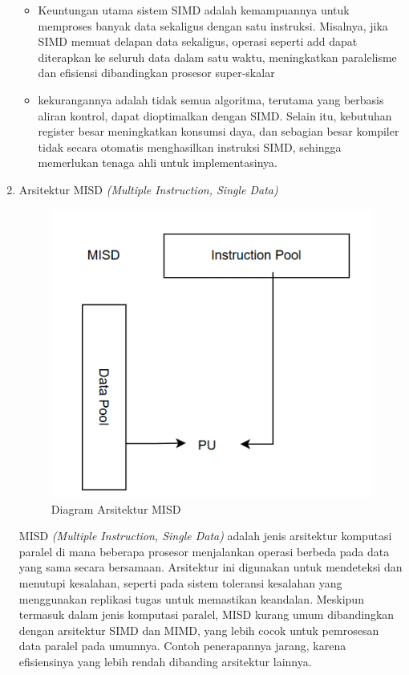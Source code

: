 \documentclass[12pt]{article}
\begin{document}
\begin{enumerate}
    \begin{itemize}
        \item Keuntungan utama sistem SIMD adalah kemampuannya untuk memproses banyak data sekaligus dengan satu instruksi. Misalnya, jika SIMD memuat delapan data sekaligus, operasi seperti add dapat diterapkan ke seluruh data dalam satu waktu, meningkatkan paralelisme dan efisiensi dibandingkan prosesor super-skalar
        \item kekurangannya adalah tidak semua algoritma, terutama yang berbasis aliran kontrol, dapat dioptimalkan dengan SIMD. Selain itu, kebutuhan register besar meningkatkan konsumsi daya, dan sebagian besar kompiler tidak secara otomatis menghasilkan instruksi SIMD, sehingga memerlukan tenaga ahli untuk implementasinya.
    \end{itemize}

    \item Arsitektur MISD \textit{(Multiple Instruction, Single Data)}

        \noindent
        \begin{figure}[H]
            \centering
            \includegraphics[width=0.4\linewidth]{asset/image8.png}
            \caption{Diagram Arsitektur MISD}
            \label{fig:Diagram-Arsitektur-MISD}
        \end{figure}

    MISD \textit{(Multiple Instruction, Single Data)} adalah jenis arsitektur komputasi paralel di mana beberapa prosesor menjalankan operasi berbeda pada data yang sama secara bersamaan. Arsitektur ini digunakan untuk mendeteksi dan menutupi kesalahan, seperti pada sistem toleransi kesalahan yang menggunakan replikasi tugas untuk memastikan keandalan. Meskipun termasuk dalam jenis komputasi paralel, MISD kurang umum dibandingkan dengan arsitektur SIMD dan MIMD, yang lebih cocok untuk pemrosesan data paralel pada umumnya. Contoh penerapannya jarang, karena efisiensinya yang lebih rendah dibanding arsitektur lainnya.


\end{enumerate}
\end{document}
